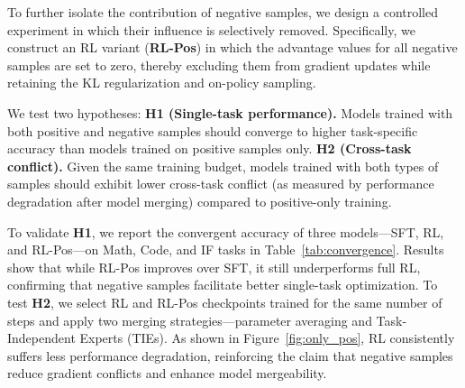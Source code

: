 \documentclass{article} %
\begin{document}



To further isolate the contribution of negative samples, we design a controlled experiment in which their influence is selectively removed. Specifically, we construct an RL variant (\textbf{RL-Pos}) in which the advantage values for all negative samples are set to zero, thereby excluding them from gradient updates while retaining the KL regularization and on-policy sampling.

We test two hypotheses: \textbf{H1 (Single-task performance).}  
Models trained with both positive and negative samples should converge to higher task-specific accuracy than models trained on positive samples only. 
\textbf{H2 (Cross-task conflict).}  
Given the same training budget, models trained with both types of samples should exhibit lower cross-task conflict (as measured by performance degradation after model merging) compared to positive-only training.

To validate \textbf{H1}, we report the convergent accuracy of three models—SFT, RL, and RL-Pos—on Math, Code, and IF tasks in Table~\ref{tab:convergence}. Results show that while RL-Pos improves over SFT, it still underperforms full RL, confirming that negative samples facilitate better single-task optimization.
To test \textbf{H2}, we select RL and RL-Pos checkpoints trained for the same number of steps and apply two merging strategies—parameter averaging and Task-Independent Experts (TIEs). As shown in Figure~\ref{fig:only_pos}, RL consistently suffers less performance degradation, reinforcing the claim that negative samples reduce gradient conflicts and enhance model mergeability.
\end{document}
